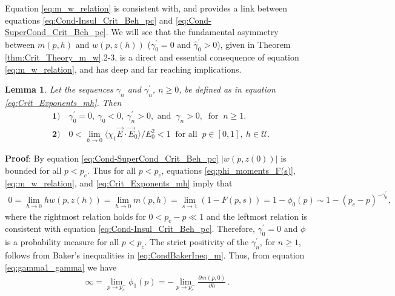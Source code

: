 \documentclass[english,12pt,jmp,graphicx]{revtex4-1}
\newtheorem{lemma}{Lemma}[section]
\newcommand{\gh}{\hat{\gamma}}
\begin{document}
Equation \eqref{eq:m_w_relation} is consistent with, and provides a
link between equations \eqref{eq:Cond-Insul_Crit_Beh_pc} and
\eqref{eq:Cond-SuperCond_Crit_Beh_pc}. We will see that the
fundamental asymmetry  between $m(p,h)$ and $w(p,z(h))$ ($\gamma_0^\prime=0$ and
$\gh_0^\prime>0$), given in Theorem \ref{thm:Crit_Theory_m_w}.2-3, is a
direct and essential consequence of equation \eqref{eq:m_w_relation},
and has deep and far reaching implications.      
%
\begin{lemma}\label{lem:zero_gamma0}
  Let the sequences $\gamma_n$ and $\gamma_n^\prime$, $n\geq0$, be defined as in
  equation \eqref{eq:Crit_Exponents_mh}. Then
  \begin{align*}
    &\mathbf{1)} \quad \gamma_0^\prime=0, \ \gamma_0<0, \ \gamma_n^\prime>0,   \text{ and } \ \gamma_n>0, \
        \text{ for } \ n\geq1. \\
    &\mathbf{2)} \quad 0<\lim_{h\to0}\langle\chi_1\vec{E}\cdot\vec{E}_0\rangle/E_0^2<1 \
         \text{ for all } \ p\in[0,1], \ h\in\mathcal{U}.
  \end{align*}
\end{lemma}
%
\noindent \textbf{Proof}:
%
By equation \eqref{eq:Cond-SuperCond_Crit_Beh_pc} $|w(p,z(0))|$ is  
bounded for all $p<p_c$. Thus for all $p<p_c$, equations
\eqref{eq:phi_moments_F(s)}, \eqref{eq:m_w_relation},
and \eqref{eq:Crit_Exponents_mh} imply that
%
\begin{align*}
  0=\lim_{h\to0}hw(p,z(h))=\lim_{h\to0}m(p,h)=\lim_{s\to1}(1-F(p,s))=1-\phi_0(p)\sim1-(p_c-p)^{-\gamma_0^\prime},
\end{align*}
%
where the rightmost relation holds for $0<p_c-p\ll1$ and the leftmost
relation is consistent with equation
\eqref{eq:Cond-Insul_Crit_Beh_pc}. Therefore, $\gamma_0^\prime=0$ and $\phi$ is a
probability measure for all $p<p_c$. The strict positivity of the
$\gamma_n^\prime$, for $n\geq1$, follows from Baker's inequalities
in \eqref{eq:CondBakerIneq_m}. Thus, from equation
\eqref{eq:gamma1_gamma} we have 
%
\begin{align}\label{eq:div_phi1}
  \infty=\lim_{p\to p_c^-}\phi_1(p)=-\lim_{p\to p_c^-}\frac{\partial m(p,0)}{\partial h}\,.
\end{align}
%
\end{document}
